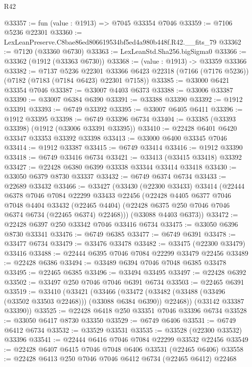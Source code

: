 \begin{lexlean}{R42}
\begin{coremodule}
{@33357 := fun (value : @1913) => @7045 @33354 @7046
@33359 := @7106 @5236 @22301
@33360 := LexLeanPreserve.C8bae86ed806619534bf5ed4a980b448f.R42.__fits_79
@33362 := @7120 (@33360 @6730)
@33363 := LexLeanStd.Sha256.bigSigma0
@33366 := @33362 (@1912 (@33363 @6730))
@33368 := (value : @1913) -> @33359 @33366
@33382 := @7137
    @5236
    @22301
    @33366
    @6423
    @22318
    (@7166 (@7176 @5236))
    (@7182 (@7183 (@7184 @6423) @22301 @7158))
@33385 := @33000 @6421 @33354 @7046
@33387 := @33007 @4403 @6373
@33388 := @33006 @33387
@33390 := @33007 @6384 @6390
@33391 := @33388 @33390
@33392 := @1912 @33391
@33393 := @6749 @33392
@33395 := @33007 @6405 @6411
@33396 := @1912 @33395
@33398 := @6749 @33396 @6734
@33404 := @33385 (@33393 @33398) (@1912 (@33006 @33391 @33395))
@33410 := @22428 @6401 @6420 @33347 @33353 @33392 @33398
@33413 := @33000 @6400 @33345 @7046
@33414 := @1912 @33387
@33415 := @6749 @33414
@33416 := @1912 @33390
@33418 := @6749 @33416 @6734
@33421 := @33413 (@33415 @33418) @33392
@33427 := @22428 @6380 @6399 @33338 @33344 @33414 @33418
@33430 := @33050 @6379 @8730 @33337
@33432 := @6749 @6374 @6734
@33433 := @22689 @33432
@33466 := @33427
    (@33430
      (@22300 @33433)
      @33414
      (@22444
        @6378
        @7046
        @7084
        @22299
        @33433
        @22456
        (@22428
          @4405
          @6377
          @7046
          @7048
          @4404
          @33432
          (@22465 @4404)
          (@22428 @6375 @250 @7046 @7046 @6374 @6734 (@22465 @6374) @22468)))
      (@33088 @4403 @6373))
@33472 := @22428 @6397 @250 @33342 @7046 @33416 @6734
@33475 := @33050 @6396 @8730 @33341
@33476 := @6749 @6385
@33477 := @6749 @6391
@33478 := @33477 @6734
@33479 := @33476 @33478
@33482 := @33475 (@22300 @33479) @33416
@33488 := @22444 @6395 @7046 @7084 @22299 @33479 @22456
@33489 := @22428 @6386
@33494 := @33489 @6394 @7046 @7048 @6385 @33478
@33495 := @22465 @6385
@33496 := @33494 @33495
@33497 := @22428 @6392
@33502 := @33497 @250 @7046 @7046 @6391 @6734
@33503 := @22465 @6391
@33519 := @33410
    (@33421
      (@33466
        (@33472 (@33482 (@33488 (@33496 (@33502 @33503 @22468))) (@33088 @6384 @6390)) @22468))
      (@33142 @33387 @33390))
@33525 := @22428 @6418 @250 @33351 @7046 @33396 @6734
@33528 := @33050 @6417 @8730 @33350
@33529 := @6749 @6406
@33531 := @6749 @6412 @6734
@33532 := @33529 @33531
@33535 := @33528 (@22300 @33532) @33396
@33541 := @22444 @6416 @7046 @7084 @22299 @33532 @22456
@33549 := @22428 @6407 @6415 @7046 @7048 @6406 @33531 (@22465 @6406)
@33558 := @22428 @6413 @250 @7046 @7046 @6412 @6734 (@22465 @6412) @22468
}
\end{coremodule}
\end{lexlean}
